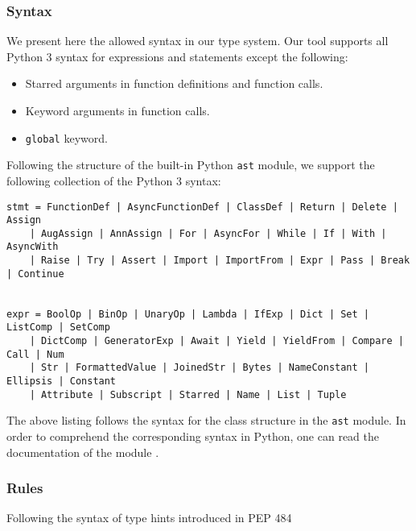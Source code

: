 \subsubsection{Syntax}
We present here the allowed syntax in our type system. Our tool supports all Python 3 syntax for expressions and statements except the following:
\begin{itemize}
	\item Starred arguments in function definitions and function calls.
	\item Keyword arguments in function calls.
	\item \lstinline|global| keyword.
\end{itemize}

Following the structure of the built-in Python \lstinline|ast| module, we support the following collection of the Python 3 syntax:

\begin{lstlisting}[xleftmargin=0\textwidth, xrightmargin=0\textwidth]
stmt = FunctionDef | AsyncFunctionDef | ClassDef | Return | Delete | Assign
	| AugAssign | AnnAssign | For | AsyncFor | While | If | With | AsyncWith
	| Raise | Try | Assert | Import | ImportFrom | Expr | Pass | Break | Continue


expr = BoolOp | BinOp | UnaryOp | Lambda | IfExp | Dict | Set | ListComp | SetComp
	| DictComp | GeneratorExp | Await | Yield | YieldFrom | Compare | Call | Num
	| Str | FormattedValue | JoinedStr | Bytes | NameConstant | Ellipsis | Constant
	| Attribute | Subscript | Starred | Name | List | Tuple

\end{lstlisting}
The above listing follows the syntax for the class structure in the \lstinline|ast| module. In order to comprehend the corresponding syntax in Python, one can read the documentation of the module \cite{ast_documentation}.


\subsubsection{Rules}
Following the syntax of type hints introduced in PEP 484 \cite{484}
